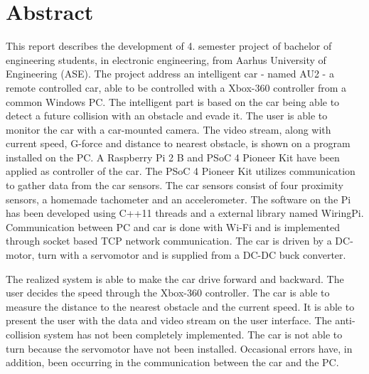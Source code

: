 \chapter{Abstract}
\label{ch:Abstract}

This report describes the development of 4. semester project of bachelor of engineering students, in electronic engineering, from Aarhus University of Engineering (ASE).
The project address an intelligent car - named AU2 - a remote controlled car, able to be controlled with a Xbox-360 controller\cite{lib:xbox-360} from a common Windows PC.
The intelligent part is based on the car being able to detect a future collision with an obstacle and evade it.
The user is able to monitor the car with a car-mounted camera\cite{lib:cam}.
The video stream, along with current speed, G-force and distance to nearest obstacle, is shown on a program installed on the PC.
A Raspberry Pi 2 B and PSoC 4 Pioneer Kit\cite{lib:psoc4_guide} have been applied as controller of the car. The PSoC 4 Pioneer Kit utilizes \IIC communication to gather data from the car sensors. The car sensors consist of four proximity sensors\cite{lib:maxsonar}, a homemade tachometer and an accelerometer\cite{lib:accel}.
The software on the Pi has been developed using C++11 threads and a external \IIC library named WiringPi\cite{lib:wiringpi}.
Communication between PC and car is done with Wi-Fi and is implemented through socket based TCP network communication.
The car is driven by a DC-motor, turn with a servomotor and is supplied from a DC-DC buck converter.

The realized system is able to make the car drive forward and backward. The user decides the speed through the Xbox-360 controller. The car is able to measure the distance to the nearest obstacle and the current speed. It is able to present the user with the data and video stream on the user interface. The anti-collision system has not been completely implemented. The car is not able to turn because the servomotor have not been installed. Occasional errors have, in addition, been occurring in the communication between the car and the PC.

\clearpage